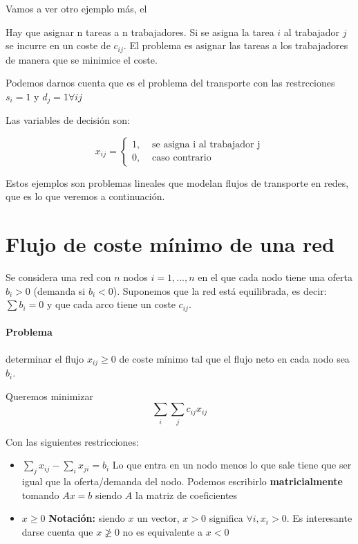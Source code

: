 Vamos a ver otro ejemplo más, el 
\begin{example}
Hay que asignar n tareas a n trabajadores. Si se asigna la tarea $i$ al
trabajador $j$ se incurre en un coste de $c_{ij}$.
El problema es asignar las tareas a los trabajadores de manera que se minimice el coste.

Podemos darnos cuenta que es el problema del transporte con las restrcciones $s_i = 1$ y $d_j = 1 ∀ij$

Las variables de decisión son:

\[x_{ij} = \left\{ \begin{array}{cc} 1, & \text{ se asigna i al trabajador j}\\0, & \text{ caso contrario}\end{array} \right. \]

\begin{ioprob}
\end{ioprob}

\end{example}


Estos ejemplos son problemas lineales que modelan flujos de transporte en redes, que es lo que veremos a continuación.

\section{Flujo de coste mínimo de una red}

Se considera una red con $n$ nodos $i=1,...,n$ en el que cada nodo tiene una oferta $b_i > 0$ (demanda si $b_i < 0$). 
Suponemos que la red está equilibrada, es decir: $\sum b_i = 0$ y que cada arco tiene un coste $c_{ij}$.

\paragraph{Problema} determinar el flujo $x_{ij}\geq 0$ de coste mínimo tal que el flujo neto en cada nodo sea $b_i$.

Queremos minimizar \[\sum_i \sum_j c_{ij}x_{ij}\]

Con las siguientes restricciones:

\begin{itemize}
	\item $\displaystyle \sum_j x_{ij} - \sum_i x_{ji} = b_i$ Lo que entra en un nodo menos lo que sale tiene que ser igual que la oferta/demanda del nodo. 
	Podemos escribirlo \textbf{matricialmente} tomando $Ax = b$ siendo $A$ la matriz de coeficientes
	\item $x \geq 0$
	\subitem \textbf{Notación: } siendo $x$ un vector, $x > 0$ significa $∀i, x_i>0$. Es interesante darse cuenta que $x \not\geq 0 $ no es equivalente a $x<0$
\end{itemize}


